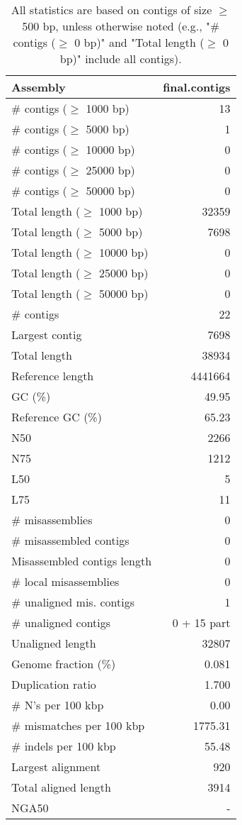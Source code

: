 \documentclass[12pt,a4paper]{article}
\begin{document}
\begin{table}[ht]
\begin{center}
\caption{All statistics are based on contigs of size $\geq$ 500 bp, unless otherwise noted (e.g., "\# contigs ($\geq$ 0 bp)" and "Total length ($\geq$ 0 bp)" include all contigs).}
\begin{tabular}{|l*{1}{|r}|}
\hline
Assembly & final.contigs \\ \hline
\# contigs ($\geq$ 1000 bp) & 13 \\ \hline
\# contigs ($\geq$ 5000 bp) & 1 \\ \hline
\# contigs ($\geq$ 10000 bp) & 0 \\ \hline
\# contigs ($\geq$ 25000 bp) & 0 \\ \hline
\# contigs ($\geq$ 50000 bp) & 0 \\ \hline
Total length ($\geq$ 1000 bp) & 32359 \\ \hline
Total length ($\geq$ 5000 bp) & 7698 \\ \hline
Total length ($\geq$ 10000 bp) & 0 \\ \hline
Total length ($\geq$ 25000 bp) & 0 \\ \hline
Total length ($\geq$ 50000 bp) & 0 \\ \hline
\# contigs & 22 \\ \hline
Largest contig & 7698 \\ \hline
Total length & 38934 \\ \hline
Reference length & 4441664 \\ \hline
GC (\%) & 49.95 \\ \hline
Reference GC (\%) & 65.23 \\ \hline
N50 & 2266 \\ \hline
N75 & 1212 \\ \hline
L50 & 5 \\ \hline
L75 & 11 \\ \hline
\# misassemblies & 0 \\ \hline
\# misassembled contigs & 0 \\ \hline
Misassembled contigs length & 0 \\ \hline
\# local misassemblies & 0 \\ \hline
\# unaligned mis. contigs & 1 \\ \hline
\# unaligned contigs & 0 + 15 part \\ \hline
Unaligned length & 32807 \\ \hline
Genome fraction (\%) & 0.081 \\ \hline
Duplication ratio & 1.700 \\ \hline
\# N's per 100 kbp & 0.00 \\ \hline
\# mismatches per 100 kbp & 1775.31 \\ \hline
\# indels per 100 kbp & 55.48 \\ \hline
Largest alignment & 920 \\ \hline
Total aligned length & 3914 \\ \hline
NGA50 & - \\ \hline
\end{tabular}
\end{center}
\end{table}
\end{document}
